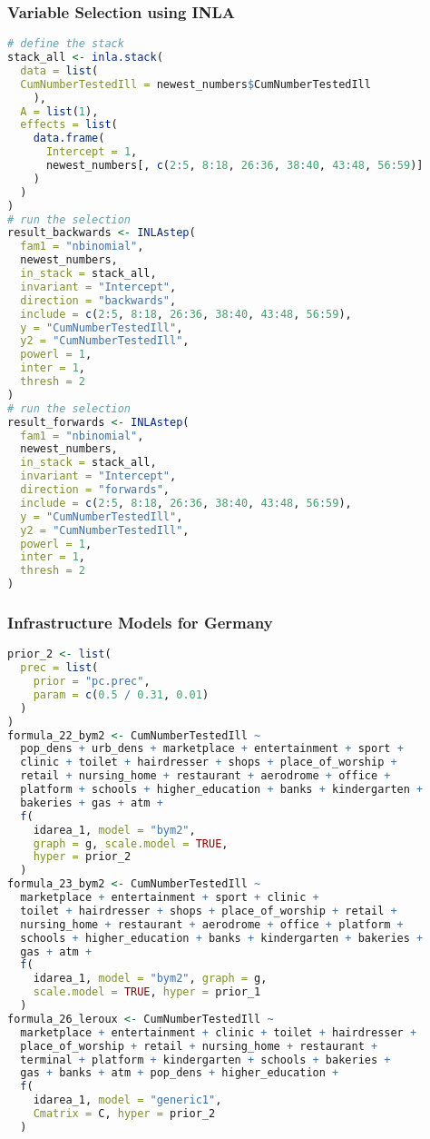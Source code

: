 \subsubsection{Variable Selection using INLA}
\begin{lstlisting}[caption={The code for variable selection in INLA.}, label={codeSelection}, language=R]
# define the stack
stack_all <- inla.stack(
  data = list(
  CumNumberTestedIll = newest_numbers$CumNumberTestedIll
    ),
  A = list(1),
  effects = list(
    data.frame(
      Intercept = 1,
      newest_numbers[, c(2:5, 8:18, 26:36, 38:40, 43:48, 56:59)]
    )
  )
)
# run the selection
result_backwards <- INLAstep(
  fam1 = "nbinomial",
  newest_numbers,
  in_stack = stack_all,
  invariant = "Intercept",
  direction = "backwards",
  include = c(2:5, 8:18, 26:36, 38:40, 43:48, 56:59),
  y = "CumNumberTestedIll",
  y2 = "CumNumberTestedIll",
  powerl = 1,
  inter = 1,
  thresh = 2
)
# run the selection
result_forwards <- INLAstep(
  fam1 = "nbinomial",
  newest_numbers,
  in_stack = stack_all,
  invariant = "Intercept",
  direction = "forwards",
  include = c(2:5, 8:18, 26:36, 38:40, 43:48, 56:59),
  y = "CumNumberTestedIll",
  y2 = "CumNumberTestedIll",
  powerl = 1,
  inter = 1,
  thresh = 2
)
\end{lstlisting}
\subsubsection{Infrastructure Models for Germany}
\begin{lstlisting}[caption={The code for the demographic models.}, label={infraGermanyCode}, language=R]
prior_2 <- list(
  prec = list(
    prior = "pc.prec",
    param = c(0.5 / 0.31, 0.01)
  )
)
formula_22_bym2 <- CumNumberTestedIll ~
  pop_dens + urb_dens + marketplace + entertainment + sport +
  clinic + toilet + hairdresser + shops + place_of_worship +
  retail + nursing_home + restaurant + aerodrome + office +
  platform + schools + higher_education + banks + kindergarten +
  bakeries + gas + atm +
  f(
    idarea_1, model = "bym2",
    graph = g, scale.model = TRUE,
    hyper = prior_2
  ) 
formula_23_bym2 <- CumNumberTestedIll ~
  marketplace + entertainment + sport + clinic +
  toilet + hairdresser + shops + place_of_worship + retail +
  nursing_home + restaurant + aerodrome + office + platform +
  schools + higher_education + banks + kindergarten + bakeries +
  gas + atm +
  f(
    idarea_1, model = "bym2", graph = g,
    scale.model = TRUE, hyper = prior_1
  ) 
formula_26_leroux <- CumNumberTestedIll ~
  marketplace + entertainment + clinic + toilet + hairdresser +
  place_of_worship + retail + nursing_home + restaurant +
  terminal + platform + kindergarten + schools + bakeries +
  gas + banks + atm + pop_dens + higher_education +
  f(
    idarea_1, model = "generic1",
    Cmatrix = C, hyper = prior_2
  )
\end{lstlisting}
